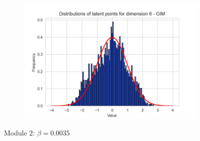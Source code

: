 \begin{figure}[h]
\begin{subfigure}[b]{0.25\textwidth}
	\end{subfigure}
	\hfill
	\begin{subfigure}[b]{0.25\textwidth}
		\centering
		\includegraphics[width=1\linewidth]{"graphs/distr/module2 kld0035/_ distribution_latent_space_GIM_dim=5"}
	\end{subfigure}
	\caption{Module 2: $\beta=0.0035$}
	\label{fig:distr_module2_beta0035}
\end{figure}
